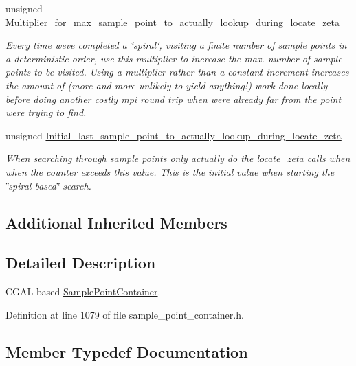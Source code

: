 \begin{DoxyCompactItemize}
unsigned \hyperlink{classCGALSamplePointContainer_a69228017e710efddcaed38fa2ad620c8}{Multiplier\+\_\+for\+\_\+max\+\_\+sample\+\_\+point\+\_\+to\+\_\+actually\+\_\+lookup\+\_\+during\+\_\+locate\+\_\+zeta}
\begin{DoxyCompactList}\small\item\em Every time we\textquotesingle{}ve completed a \char`\"{}spiral\char`\"{}, visiting a finite number of sample points in a deterministic order, use this multiplier to increase the max. number of sample points to be visited. Using a multiplier rather than a constant increment increases the amount of (more and more unlikely to yield anything!) work done locally before doing another costly mpi round trip when we\textquotesingle{}re already far from the point we\textquotesingle{}re trying to find. \end{DoxyCompactList}\item 
unsigned \hyperlink{classCGALSamplePointContainer_aa430905eee4411f05aadae3e60a59ff8}{Initial\+\_\+last\+\_\+sample\+\_\+point\+\_\+to\+\_\+actually\+\_\+lookup\+\_\+during\+\_\+locate\+\_\+zeta}
\begin{DoxyCompactList}\small\item\em When searching through sample points only actually do the locate\+\_\+zeta calls when when the counter exceeds this value. This is the initial value when starting the \char`\"{}spiral based\char`\"{} search. \end{DoxyCompactList}\end{DoxyCompactItemize}
\subsection*{Additional Inherited Members}


\subsection{Detailed Description}
C\+G\+A\+L-\/based \hyperlink{classSamplePointContainer}{Sample\+Point\+Container}. 

Definition at line 1079 of file sample\+\_\+point\+\_\+container.\+h.



\subsection{Member Typedef Documentation}
\mbox{\label{classCGALSamplePointContainer_a381241085bd45dcba4709de640071982}} 
